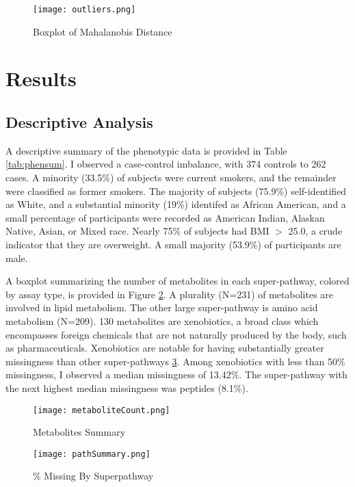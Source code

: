 \documentclass{article}
\begin{document}
\begin{figure}
  \centering
  \caption{Boxplot of Mahalanobis Distance}
  \texttt{[image: outliers.png]}
  \label{fig:mahDist}
  \end{figure}

\section*{Results}

\subsection*{Descriptive Analysis}
A descriptive summary of the phenotypic data is provided in Table \ref{tab:phensum}. I observed a case-control imbalance, with 374 controls to 262 cases. A minority (33.5\%) of subjects were current smokers, and the remainder were classified as former smokers. The majority of subjects (75.9\%) self-identified as White, and a substantial minority (19\%) identifed as African American, and a small percentage of participants were recorded as American Indian, Alaskan Native, Asian, or Mixed race. Nearly 75\% of subjects had BMI \(>\) 25.0, a crude indicator that they are overweight. A small majority (53.9\%) of participants are male.

A boxplot summarizing the number of metabolites in each super-pathway, colored by assay type, is provided in Figure \ref{fig:metabSum}. A plurality (N=231) of metabolites are involved in lipid metabolism. The other large super-pathway is amino acid metabolism (N=209). 130 metabolites are xenobiotics, a broad class which encompasses foreign chemicals that are not naturally produced by the body, such as pharmaceuticals. Xenobiotics are notable for having substantially greater missingness than other super-pathways \ref{fig:pathMiss}. Among xenobiotics with less than 50\% missingness, I observed a median missingness of 13.42\%. The super-pathway with the next highest median missingness was peptides (8.1\%).



\begin{figure}
  \centering
  \caption{Metabolites Summary}
  \texttt{[image: metaboliteCount.png]}
  \label{fig:metabSum}
  \end{figure}

\begin{figure}
  \centering
  \caption{\% Missing By Superpathway}
  \texttt{[image: pathSummary.png]}
  \label{fig:pathMiss}
  \end{figure}
\end{document}
